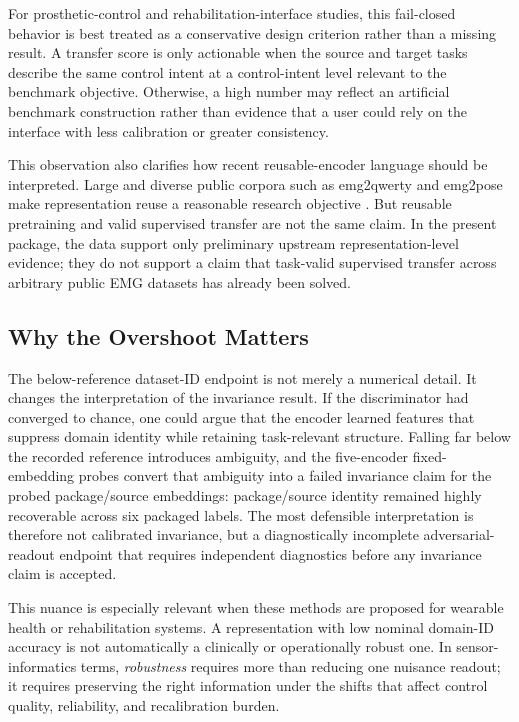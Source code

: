 \documentclass[journal]{IEEEtran}
\begin{document}
For prosthetic-control and rehabilitation-interface studies, this fail-closed behavior is best treated as a conservative design criterion rather than a missing result. A transfer score is only actionable when the source and target tasks describe the same control intent at a control-intent level relevant to the benchmark objective. Otherwise, a high number may reflect an artificial benchmark construction rather than evidence that a user could rely on the interface with less calibration or greater consistency.

This observation also clarifies how recent reusable-encoder language should be interpreted. Large and diverse public corpora such as emg2qwerty and emg2pose make representation reuse a reasonable research objective \cite{sivakumar2024emg2qwerty,salter2024emg2pose}. But reusable pretraining and valid supervised transfer are not the same claim. In the present package, the data support only preliminary upstream representation-level evidence; they do not support a claim that task-valid supervised transfer across arbitrary public EMG datasets has already been solved.

\subsection{Why the Overshoot Matters}
The below-reference dataset-ID endpoint is not merely a numerical detail. It changes the interpretation of the invariance result. If the discriminator had converged to chance, one could argue that the encoder learned features that suppress domain identity while retaining task-relevant structure. Falling far below the recorded reference introduces ambiguity, and the five-encoder fixed-embedding probes convert that ambiguity into a failed invariance claim for the probed package/source embeddings: package/source identity remained highly recoverable across six packaged labels. The most defensible interpretation is therefore not calibrated invariance, but a diagnostically incomplete adversarial-readout endpoint that requires independent diagnostics before any invariance claim is accepted.

This nuance is especially relevant when these methods are proposed for wearable health or rehabilitation systems. A representation with low nominal domain-ID accuracy is not automatically a clinically or operationally robust one. In sensor-informatics terms, \emph{robustness} requires more than reducing one nuisance readout; it requires preserving the right information under the shifts that affect control quality, reliability, and recalibration burden.
\end{document}
